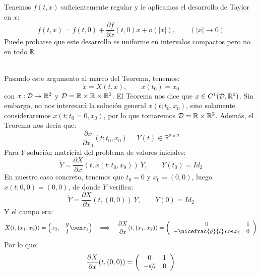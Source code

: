 \begin{ejercicio}
    Tenemos $f(t,x)$ suficientemente regular y le aplicamos el desarrollo de Taylor en $x$:
    \begin{equation*}
        f(t,x) = f(t,0) + \frac{\partial f}{\partial x}(t,0)x + o(|x|), \qquad (|x|\to 0)
    \end{equation*}
    Puede probarse que este desarrollo es uniforme en intervalos compactos pero no en todo $\mathbb{R}$.
\end{ejercicio}~\\

\noindent
Pasando este argumento al marco del Teorema, tenemos:
\begin{equation*}
    \dot{x} = X(t,x), \qquad x(t_0)=x_0
\end{equation*}
con $x:\mathcal{D}\to \mathbb{R}^2$ y $\mathcal{D}=\mathbb{R}\times\mathbb{R}\times\mathbb{R}^2$. El Teorema nos dice que $x\in C^1(\mathcal{D},\mathbb{R}^2)$. Sin embargo, no nos interesará la solución general $x(t;t_0,x_0)$, sino solamente consideraremos $x(t;t_0=0,x_0)$, por lo que tomaremos $\mathcal{D}=\mathbb{R}\times\mathbb{R}^2$. Además, el Teorema nos decía que:
\begin{equation*}
    \frac{\partial x}{\partial x_0}(t;t_0,x_0) = Y(t) \in \mathbb{R}^{2\times 2}
\end{equation*}
Para $Y$ solución matricial del problema de valores iniciales:
\begin{equation*}
    \dot{Y} = \frac{\partial X}{\partial x}(t,x(t;t_0,x_0))\ Y, \qquad Y(t_0) = Id_2
\end{equation*}
En nuestro caso concreto, tenemos que $t_0=0$ y $x_0 = (0,0)$, luego $x(t;0,0) = (0,0)$, de donde $Y$ verifica:
\begin{equation*}
    \dot{Y} = \frac{\partial X}{\partial x}(t,(0,0))\ Y, \qquad Y(0) = Id_2
\end{equation*}
Y el campo era:
\begin{equation*}
    X(t,(x_1,x_2)) = \left(x_2, -\frac{g}{l}\sen x_1\right) \quad\Longrightarrow\quad \frac{\partial X}{\partial x}(t,(x_1,x_2)) = \left(\begin{array}{cc}
        0 & 1 \\
        -\nicefrac{g}{l}\cos x_1 & 0 
    \end{array}\right)
\end{equation*}
Por lo que:
\begin{equation*}
    \frac{\partial X}{\partial x}(t,(0,0)) = \left(\begin{array}{cc}
        0 & 1 \\
        -\nicefrac{g}{l} & 0 
    \end{array}\right)
\end{equation*}
